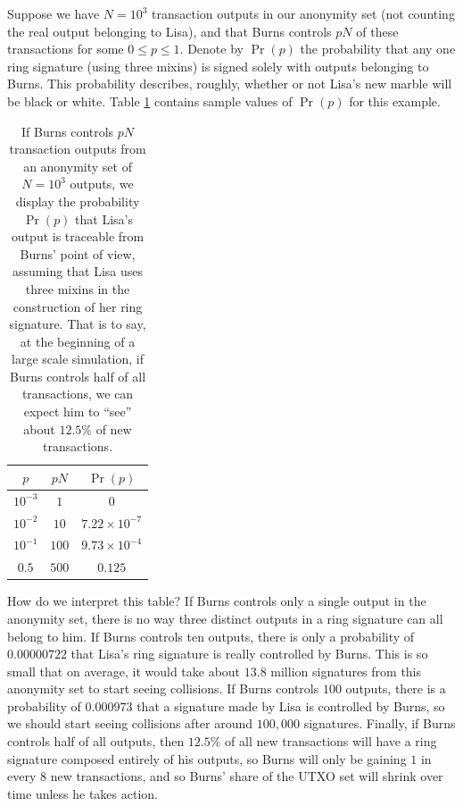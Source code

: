 \documentclass{mrl}
\begin{document}
Suppose we have $N=10^3$ transaction outputs in our anonymity set (not counting the real output belonging to Lisa), and that Burns controls $pN$ of these transactions for some $0 \leq p \leq 1$.  Denote by $\Pr(p)$ the probability that any one ring signature (using three mixins) is signed solely with outputs belonging to Burns. This probability describes, roughly, whether or not Lisa's new marble will be black or white. Table \ref{3mixins} contains sample values of $\Pr(p)$ for this example.

\begin{table}[!h]
\begin{center}
\begin{tabular}{c|c|c}
$p$ & $pN$ & $\Pr(p)$ \\ \hline
$10^{-3}$ & $1$ & $0$ \\
$10^{-2}$ & $10$ & $7.22\times 10^{-7}$ \\
$10^{-1}$ & $100$ & $9.73 \times 10^{-4}$\\
$0.5$ & $500$ & $0.125$
\end{tabular}
\caption{If Burns controls $pN$ transaction outputs from an anonymity set of $N=10^3$ outputs, we display the probability $\Pr(p)$ that Lisa's output is traceable from Burns' point of view, assuming that Lisa uses three mixins in the construction of her ring signature. That is to say, at the beginning of a large scale simulation, if Burns controls half of all transactions, we can expect him to ``see'' about $12.5\%$ of new transactions.}
\label{3mixins}
\end{center}
\end{table}

How do we interpret this table? If Burns controls only a single output in the anonymity set, there is no way three distinct outputs in a ring signature can all belong to him. If Burns controls ten outputs, there is only a probability of $0.00000722$ that Lisa's ring signature is really controlled by Burns. This is so small that on average, it would take about $13.8$ million signatures from this anonymity set to start seeing collisions. If Burns controls $100$ outputs, there is a probability of $0.000973$ that a signature made by Lisa is controlled by Burns, so we should start seeing collisions after around $100,000$ signatures. Finally, if Burns controls half of all outputs, then $12.5\%$ of all new transactions will have a ring signature composed entirely of his outputs, so Burns will only be gaining $1$ in every $8$ new transactions, and so Burns' share of the UTXO set will shrink over time unless he takes action.
\end{document}
